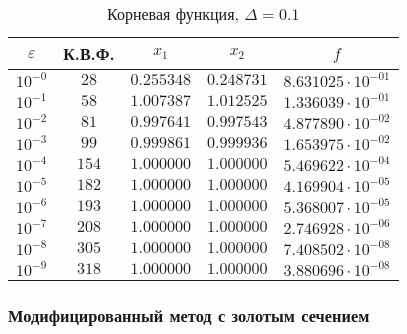\documentclass[a4paper,12pt,notitlepage,pdftex,headsepline]{scrartcl}
\begin{document}
        \begin{table}[ht]
          \centering
          \caption{Корневая функция, $\Delta = 0.1$}
          \begin{tabular}{|c|c|c|c|c|}
            \hline
            $\varepsilon$ & К.В.Ф. & $x_1$ & $x_2$ & $f$\\
            \hline
            $10^{-0}$ & $28$ & $0.255348$ & $0.248731$ & $8.631025\cdot 10^{-01}$\\
            $10^{-1}$ & $58$ & $1.007387$ & $1.012525$ & $1.336039\cdot 10^{-01}$\\
            $10^{-2}$ & $81$ & $0.997641$ & $0.997543$ & $4.877890\cdot 10^{-02}$\\
            $10^{-3}$ & $99$ & $0.999861$ & $0.999936$ & $1.653975\cdot 10^{-02}$\\
            $10^{-4}$ & $154$ & $1.000000$ & $1.000000$ & $5.469622\cdot 10^{-04}$\\
            $10^{-5}$ & $182$ & $1.000000$ & $1.000000$ & $4.169904\cdot 10^{-05}$\\
            $10^{-6}$ & $193$ & $1.000000$ & $1.000000$ & $5.368007\cdot 10^{-05}$\\
            $10^{-7}$ & $208$ & $1.000000$ & $1.000000$ & $2.746928\cdot 10^{-06}$\\
            $10^{-8}$ & $305$ & $1.000000$ & $1.000000$ & $7.408502\cdot 10^{-08}$\\
            $10^{-9}$ & $318$ & $1.000000$ & $1.000000$ & $3.880696\cdot 10^{-08}$\\
            \hline
          \end{tabular}
        \end{table}

        \clearpage
    \subsubsection{Модифицированный метод с золотым сечением}
\end{document}

